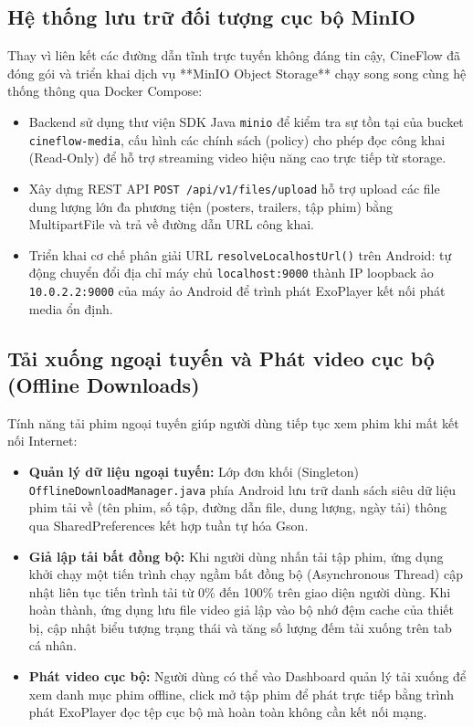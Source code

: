 \subsection{Hệ thống lưu trữ đối tượng cục bộ MinIO}
\label{subsec:minio_storage}

Thay vì liên kết các đường dẫn tĩnh trực tuyến không đáng tin cậy, CineFlow đã đóng gói và triển khai dịch vụ **MinIO Object Storage** chạy song song cùng hệ thống thông qua Docker Compose:
\begin{itemize}
    \item Backend sử dụng thư viện SDK Java \texttt{minio} để kiểm tra sự tồn tại của bucket \texttt{cineflow-media}, cấu hình các chính sách (policy) cho phép đọc công khai (Read-Only) để hỗ trợ streaming video hiệu năng cao trực tiếp từ storage.
    \item Xây dựng REST API \texttt{POST /api/v1/files/upload} hỗ trợ upload các file dung lượng lớn đa phương tiện (posters, trailers, tập phim) bằng MultipartFile và trả về đường dẫn URL công khai.
    \item Triển khai cơ chế phân giải URL \texttt{resolveLocalhostUrl()} trên Android: tự động chuyển đổi địa chỉ máy chủ \texttt{localhost:9000} thành IP loopback ảo \texttt{10.0.2.2:9000} của máy ảo Android để trình phát ExoPlayer kết nối phát media ổn định.
\end{itemize}

\subsection{Tải xuống ngoại tuyến và Phát video cục bộ (Offline Downloads)}
\label{subsec:offline_downloads}

Tính năng tải phim ngoại tuyến giúp người dùng tiếp tục xem phim khi mất kết nối Internet:
\begin{itemize}
    \item \textbf{Quản lý dữ liệu ngoại tuyến:} Lớp đơn khối (Singleton) \texttt{OfflineDownloadManager.java} phía Android lưu trữ danh sách siêu dữ liệu phim tải về (tên phim, số tập, đường dẫn file, dung lượng, ngày tải) thông qua SharedPreferences kết hợp tuần tự hóa Gson.
    \item \textbf{Giả lập tải bất đồng bộ:} Khi người dùng nhấn tải tập phim, ứng dụng khởi chạy một tiến trình chạy ngầm bất đồng bộ (Asynchronous Thread) cập nhật liên tục tiến trình tải từ 0\% đến 100\% trên giao diện người dùng. Khi hoàn thành, ứng dụng lưu file video giả lập vào bộ nhớ đệm cache của thiết bị, cập nhật biểu tượng trạng thái và tăng số lượng đếm tải xuống trên tab cá nhân.
    \item \textbf{Phát video cục bộ:} Người dùng có thể vào Dashboard quản lý tải xuống để xem danh mục phim offline, click mở tập phim để phát trực tiếp bằng trình phát ExoPlayer đọc tệp cục bộ mà hoàn toàn không cần kết nối mạng.
\end{itemize}

